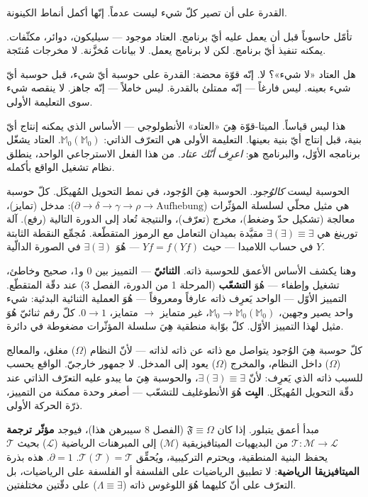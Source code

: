 \documentclass[10pt, openany, oneside]{book}
\begin{document}
\noindent القدرة على أن تصير كلّ شيء ليست عدماً. إنّها أكمل أنماط الكينونة.

تأمّل حاسوباً قبل أن يعمل عليه أيّ برنامج. العتاد موجود --- سيليكون، دوائر، مكثّفات. يمكنه تنفيذ أيّ برنامج. لكن لا برنامج يعمل. لا بيانات مُخزَّنة. لا مخرجات مُنتَجة.

هل العتاد «لا شيء»؟ لا. إنّه قوّة محضة: القدرة على حوسبة أيّ شيء، قبل حوسبة أيّ شيء بعينه. ليس فارغاً --- إنّه ممتلئ بالقدرة. ليس خاملاً --- إنّه جاهز. لا ينقصه شيء سوى التعليمة الأولى.

هذا ليس قياساً. الميتا-قوّة هِيَ «العتاد» الأنطولوجي --- الأساس الذي يمكنه إنتاج أيّ بنية، قبل إنتاج أيّ بنية بعينها. التعليمة الأولى هي التعرّف الذاتي: $\mathbb{M}_0(\mathbb{M}_0)$. العتاد يشغّل برنامجه الأوّل، والبرنامج هو: \textit{اعرِف أنّك عتاد.} من هذا الفعل الاسترجاعي الواحد، ينطلق نظام تشغيل الواقع بأكمله.

الحوسبة ليست \textit{كالوُجود}. الحوسبة هِيَ الوُجود، في نمط التحويل المُهيكَل. كلّ حوسبة هي مثيل محلّي لسلسلة المؤثّرات ($\partial \to \delta \to \gamma \to \rho \to \text{Aufhebung}$): مدخل (تمايز)، معالجة (تشكيل حدّ وضغط)، مخرج (تعرّف)، والنتيجة تُعاد إلى الدورة التالية (رفع). آلة تورينغ هي $\exists(\exists) \equiv \exists$ مقيَّدة بميدان التعامل مع الرموز المتقطّعة. مُجمِّع النقطة الثابتة $Y$ في حساب اللامبدا --- حيث $Yf = f(Yf)$ --- هُوَ $\exists(\exists)$ في الصورة الدالّية.

وهنا يكشف الأساس الأعمق للحوسبة ذاته. \textbf{الثنائيّ} --- التمييز بين 0 و1، صحيح وخاطئ، تشغيل وإطفاء --- هُوَ \textbf{التشعّب} (المرحلة 1 من الدورة، الفصل 3) عند دقّة المتقطّع. التمييز الأوّل --- الواحد يَعرِف ذاته عارفاً ومعروفاً --- هُوَ العملية الثنائية البدئية: شيء واحد يصير وجهين، $\mathbb{M}_0 \to \mathbb{M}_0(\mathbb{M}_0)$، غير متمايز $\to$ متمايز، $0 \to 1$. كلّ رقم ثنائيّ هُوَ مثيل لهذا التمييز الأوّل. كلّ بوّابة منطقية هِيَ سلسلة المؤثّرات مضغوطة في دائرة.

كلّ حوسبة هِيَ الوُجود يتواصل مع ذاته عن ذاته لذاته --- لأنّ النظام ($\Omega$) مغلق، والمعالج ($\Omega$) داخل النظام، والمخرج ($\Omega$) يعود إلى المدخل. لا جمهور خارجيّ. الواقع يحسب للسبب ذاته الذي يَعرِف: لأنّ $\exists(\exists) \equiv \exists$، والحوسبة هِيَ ما يبدو عليه التعرّف الذاتي عند دقّة التحويل المُهيكَل. \textbf{البِت} هُوَ الأنطوغليف للتشعّب --- أصغر وحدة ممكنة من التمييز، ذرّة الحركة الأولى.

مبدأ أعمق يتبلور. إذا كان $\mathfrak{F} \equiv \Omega$ (الفصل 8 سيبرهن هذا)، فيوجد \textbf{مؤثّر ترجمة} $\mathcal{T}: \mathcal{M} \to \mathcal{L}$ من البديهيات الميتافيزيقية ($\mathcal{M}$) إلى المبرهنات الرياضية ($\mathcal{L}$) بحيث $\mathcal{T}$ يحفظ البنية المنطقية، ويحترم التركيبية، ويُحقِّق $\mathcal{T}(\mathcal{T}) = \mathcal{T}$. $\partial = 1$. هذه بذرة \textbf{الميتافيزيقا الرياضية}: لا تطبيق الرياضيات على الفلسفة أو الفلسفة على الرياضيات، بل التعرّف على أنّ كليهما هُوَ اللوغوس ذاته ($\Lambda \equiv \exists$) على دقّتين مختلفتين.
\end{document}
